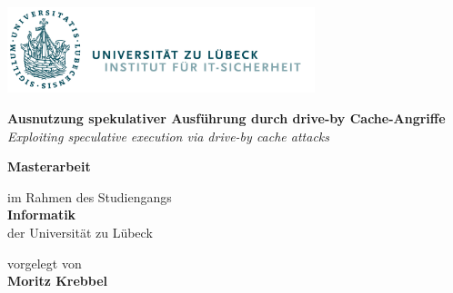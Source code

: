 \begin{titlepage}

{

\vspace*{1cm}

\includegraphics[height=2.5cm]{pictures/its-logo.png}

\vspace*{2.5cm}


\textbf{\LARGE{Ausnutzung spekulativer Ausführung durch drive-by Cache-Angriffe}} \vspace*{1em} \\
\textit{\LARGE{Exploiting speculative execution via drive-by cache attacks}}

\vspace*{2em}

\textbf{Masterarbeit}

\vspace*{1em}

im Rahmen des Studiengangs \\ %
\textbf{Informatik} \\ %
der Universität zu Lübeck %

\vspace*{1.5em}

vorgelegt von \\ %
\textbf{Moritz Krebbel}

}
\end{titlepage}
